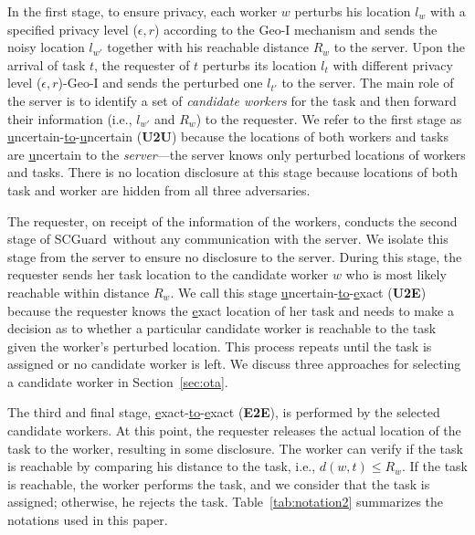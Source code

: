 \documentclass{USC-Thesis}
\newcommand{\SCG}{{SCGuard}}
\numberwithin{equation}{chapter}
\begin{document}
In the first stage, to ensure privacy, each worker $w$ perturbs his location $l_w$ with a specified privacy level ($\epsilon,r$) according to the Geo-I mechanism and sends the noisy location $l_{w'}$ together with his reachable distance $R_w$ to the server. Upon the arrival of task $t$, the requester of $t$ perturbs its location $l_t$ with different privacy level ($\epsilon,r$)-Geo-I and sends the perturbed one $l_{t'}$ to the server. The main role of the server is to identify a set of \emph{candidate workers} for the task and then forward their information (i.e., $l_{w'}$ and $R_w$) to the requester. We refer to the first stage as \underline{u}ncertain-\underline{to}-\underline{u}ncertain (\textbf{U2U}) because the locations of both workers and tasks are \underline{u}ncertain to the \emph{server}---the server knows only perturbed locations of workers and tasks. There is no location disclosure at this stage because locations of both task and worker are hidden from all three adversaries. 

The requester, on receipt of the information of the workers, conducts the second stage of \SCG\ without any communication with the server. We isolate this stage from the server to ensure no disclosure to the server. During this stage, the requester sends her task location to the candidate worker $w$ who is most likely reachable within distance $R_w$. We call this stage \underline{u}ncertain-\underline{to}-\underline{e}xact (\textbf{U2E}) because the requester knows the \underline{e}xact location of her task and needs to make a decision as to whether a particular candidate worker is reachable to the task given the worker's perturbed location. This process repeats until the task is assigned or no candidate worker is left.
We discuss three approaches for selecting a candidate worker in Section~\ref{sec:ota}.

The third and final stage, \underline{e}xact-\underline{to}-\underline{e}xact (\textbf{E2E}), is performed by the selected candidate workers. At this point, the requester releases the actual location of the task to the worker, resulting in some disclosure. The worker can verify if the task is reachable by comparing his distance to the task, i.e., $\mathit{d(w,t)\le R_w}$. If the task is reachable, the worker performs the task, and we consider that the task is assigned; otherwise, he rejects the task. Table~\ref{tab:notation2} summarizes the notations used in this paper.
\end{document}

